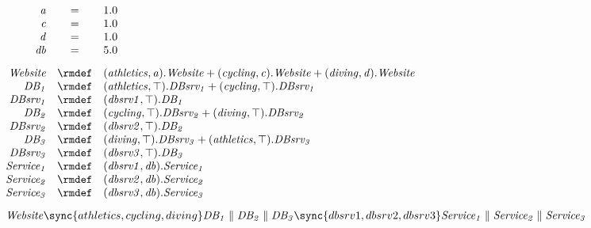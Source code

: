 \begin{displaymath}
	\begin{array}{rcl}
		\mathit{a} & = & 1.0\\
		\mathit{c} & = & 1.0\\
		\mathit{d} & = & 1.0\\
		\mathit{db} & = & 5.0\\
[2.0ex]		\mathit{Website} & \rmdef & (\mathit{athletics},\mathit{a}).\mathit{Website}+(\mathit{cycling},\mathit{c}).\mathit{Website}+(\mathit{diving},\mathit{d}).\mathit{Website}\\
		\mathit{DB_1} & \rmdef & (\mathit{athletics},\top).\mathit{DBsrv_1}+(\mathit{cycling},\top).\mathit{DBsrv_1}\\
		\mathit{DBsrv_1} & \rmdef & (\mathit{dbsrv1},\top).\mathit{DB_1}\\
		\mathit{DB_2} & \rmdef & (\mathit{cycling},\top).\mathit{DBsrv_2}+(\mathit{diving},\top).\mathit{DBsrv_2}\\
		\mathit{DBsrv_2} & \rmdef & (\mathit{dbsrv2},\top).\mathit{DB_2}\\
		\mathit{DB_3} & \rmdef & (\mathit{diving},\top).\mathit{DBsrv_3}+(\mathit{athletics},\top).\mathit{DBsrv_3}\\
		\mathit{DBsrv_3} & \rmdef & (\mathit{dbsrv3},\top).\mathit{DB_3}\\
		\mathit{Service_1} & \rmdef & (\mathit{dbsrv1},\mathit{db}).\mathit{Service_1}\\
		\mathit{Service_2} & \rmdef & (\mathit{dbsrv2},\mathit{db}).\mathit{Service_2}\\
		\mathit{Service_3} & \rmdef & (\mathit{dbsrv3},\mathit{db}).\mathit{Service_3}\\
[2.0ex]		\multicolumn{3}{l}{\mathit{Website}\sync{athletics,cycling,diving}\mathit{DB_1}\parallel\mathit{DB_2}\parallel\mathit{DB_3}\sync{dbsrv1,dbsrv2,dbsrv3}\mathit{Service_1}\parallel\mathit{Service_2}\parallel\mathit{Service_3}}\\
[2.0ex]	\end{array}
\end{displaymath}
